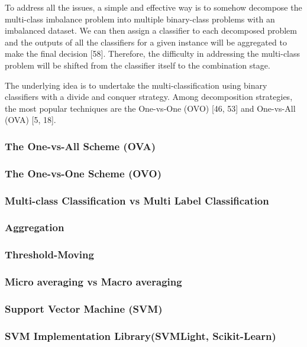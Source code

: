 To address all the issues, a simple and effective way is to somehow decompose the multi-class imbalance problem into multiple binary-class problems with an imbalanced dataset. We can then assign a classifier to each decomposed problem and the outputs of all the classifiers for a given instance will be aggregated to make the final decision [58]. Therefore, the difficulty in addressing the multi-class problem will be shifted from the classifier itself to the combination stage. 

The underlying idea is to undertake the multi-classification using binary classifiers with a divide and conquer strategy. Among decomposition strategies, the most popular techniques are the One-vs-One (OVO) [46, 53] and One-vs-All (OVA) [5, 18].

\subsubsection{The One-vs-All Scheme (OVA) }

\subsubsection{The One-vs-One Scheme (OVO) }

\subsubsection{Multi-class Classification vs Multi Label Classification}

\subsubsection{Aggregation}

\subsubsection{Threshold-Moving}

\subsubsection{Micro averaging vs Macro averaging}

\subsubsection{Support Vector Machine (SVM)}

\subsubsection{SVM Implementation Library(SVMLight, Scikit-Learn)}